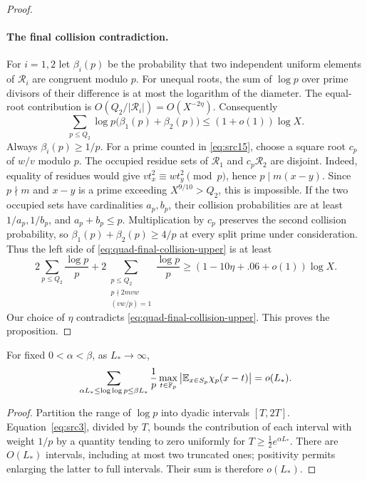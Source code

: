 \begin{proof}
\paragraph{The final collision contradiction.}
For $i=1,2$ let $\beta_i(p)$ be the probability that two independent
uniform elements of $\mathcal R_i$ are congruent modulo $p$.
For unequal roots, the sum of $\log p$ over prime divisors of their
difference is at most the logarithm of the diameter.
The equal-root contribution is
$O(Q_2/|\mathcal R_i|)=O(X^{-2\eta})$.
Consequently
\begin{equation}\label{eq:quad-final-collision-upper}
 \sum_{p\leq Q_2}\log p\bigl(\beta_1(p)+\beta_2(p)\bigr)
                       \leq(1+o(1))\log X.
\end{equation}
Always $\beta_i(p)\geq1/p$.
For a prime counted in \eqref{eq:src15}, choose a square root
$c_p$ of $w/v$ modulo $p$.  The occupied residue sets of
$\mathcal R_1$ and $c_p\mathcal R_2$ are disjoint.
Indeed, equality of residues would give
$vt_x^2\equiv wt_y^2\pmod p$, hence $p\mid m(x-y)$.
Since $p\nmid m$ and $x-y$ is a prime exceeding $X^{9/10}>Q_2$,
this is impossible.
If the two occupied sets have cardinalities $a_p,b_p$, their
collision probabilities are at least $1/a_p,1/b_p$, and
$a_p+b_p\leq p$.  Multiplication by $c_p$ preserves the second
collision probability, so
$\beta_1(p)+\beta_2(p)\geq4/p$ at every split prime under
consideration.
Thus the left side of \eqref{eq:quad-final-collision-upper} is at
least
\[
 2\sum_{p\leq Q_2}\frac{\log p}{p}
 +2\sum_{\substack{p\leq Q_2\\p\nmid2mvw\\(vw/p)=1}}
          \frac{\log p}{p}
 \geq(1-10\eta+.06+o(1))\log X.
\]
Our choice of $\eta$ contradicts
\eqref{eq:quad-final-collision-upper}.  This proves the proposition.
\end{proof}

\begin{corollary}\label{cor:quad-harmonic}
For fixed $0<\alpha<\beta$, as $L_*\longrightarrow\infty$,
\[
 \sum_{\alpha L_*\leq\log\log p\leq\beta L_*}\frac1p
       \max_{t\in\mathbb F_p}
       \left|\mathbb E_{x\in S_p}\chi_p(x-t)\right|=o(L_*).
\]
\end{corollary}
\begin{proof}
Partition the range of $\log p$ into dyadic intervals $[T,2T]$.
Equation~\eqref{eq:src3}, divided by $T$, bounds the contribution of
each interval with weight $1/p$ by a quantity tending to zero
uniformly for $T\geq\tfrac12e^{\alpha L_*}$.
There are $O(L_*)$ intervals, including at most two truncated ones;
positivity permits enlarging the latter to full intervals.  Their
sum is therefore $o(L_*)$.
\end{proof}
